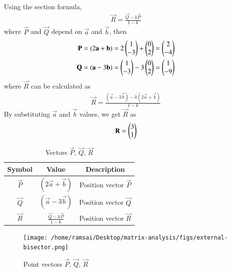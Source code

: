 \begin{enumerate}[label=\thesection.\arabic*,ref=\thesection.\theenumi]
Using the section formula,
\begin{align}
    \vec{R} = \frac{\vec{Q} - k\vec{P}}{1 - k}
\end{align}
where $\vec{P}$ and $\vec{Q}$ depend on $\vec{a}$ and $\vec{b}$, then
\begin{align}
    \mathbf{P} &= (2\mathbf{a} + \mathbf{b}) = 2\begin{pmatrix}1\\-3\end{pmatrix} + \begin{pmatrix}0\\2\end{pmatrix} = \begin{pmatrix}2\\-4\end{pmatrix} \\
    \mathbf{Q} &= (\mathbf{a} - 3\mathbf{b}) = \begin{pmatrix}1\\-3\end{pmatrix} - 3\begin{pmatrix}0\\2\end{pmatrix} = \begin{pmatrix}1\\-9\end{pmatrix}
\end{align}
where $\vec{R}$ can be calculated as 
\begin{align}
    \vec{R} = \frac{(\vec{a} - 3\vec{b}) - k(2\vec{a} + \vec{b})}{1 - k}
\end{align}
By substituting $\vec{a}$ and $\vec{b}$ values, we get $\vec{R}$ as
\begin{align}
    \mathbf{R} = \begin{pmatrix}3\\1\end{pmatrix}
\end{align}

\begin{table}[ht!]
    \centering
    \begin{tabular}{|c|c|c|}
        \hline
        \textbf{Symbol} & \textbf{Value} & \textbf{Description}\\
        \hline
        $\vec{P}$ & $(2\vec{a} + \vec{b})$ & Position vector $\vec{P}$ \\
        \hline
        $\vec{Q}$ & $(\vec{a} - 3\vec{b})$ & Position vector $\vec{Q}$\\
        \hline
        $\vec{R}$ & $\frac{\vec{Q} - k\vec{P}}{1 - k}$ & Position vector $\vec{R}$\\
        \hline
    \end{tabular}
    \caption{Vectors $\vec{P}$, $\vec{Q}$, $\vec{R}$}
    \label{tab:mytable2}   
\end{table}

\begin{figure}[H]
    \centering
    \texttt{[image: /home/ramsai/Desktop/matrix-analysis/figs/external-bisector.png]}
    \caption{Point vectors $\vec{P}$, $\vec{Q}$, $\vec{R}$}
    \label{fig:enter-label}
\end{figure}


\end{enumerate}
